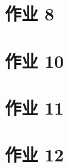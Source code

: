 \documentclass[main.tex]{subfiles}
\begin{document}
\section{作业 8}

\section{作业 10}

\section{作业 11}

\section{作业 12}

\end{document}
